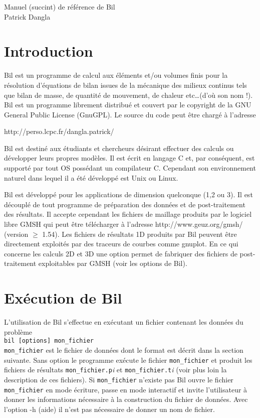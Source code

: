 \documentclass[a4paper,11pt]{article}
\begin{document}
\begin{center}
\LARGE
Manuel (succint) de r\'ef\'erence de Bil\\
\normalsize
Patrick Dangla\\
\end{center}

\section{Introduction}
Bil est un programme de calcul aux \'el\'ements et/ou volumes finis pour la r\'esolution d'\'equations de bilan issues de la m\'ecanique des milieux continus tels que bilan de masse, de quantit\'e de mouvement, de chaleur etc\ldots (d'o\`u son nom !). Bil est un programme librement distribu\'e et couvert par le copyright de la GNU General Public License (GnuGPL). Le source du code peut \^etre charg\'e \`a l'adresse 
\begin{center}
http://perso.lcpc.fr/dangla.patrick/
\end{center}
Bil est destin\'e aux \'etudiants et chercheurs d\'esirant effectuer des calculs ou d\'evelopper leurs propres mod\`eles. Il est \'ecrit en langage C et, par cons\'equent, est support\'e par tout OS poss\'edant un compilateur C. Cependant son environnement naturel dans lequel il a \'et\'e d\'evelopp\'e est Unix ou Linux.

Bil est d\'evelopp\'e pour les applications de dimension quelconque (1,2 ou 3). Il est d\'ecoupl\'e de tout programme de pr\'eparation des donn\'ees et de post-traitement des r\'esultats. Il accepte cependant les fichiers de maillage produits par le logiciel libre GMSH qui peut \^etre t\'el\'echarger \`a l'adresse http://www.geuz.org/gmsh/ (version $\geq$ 1.54). Les fichiers de r\'esultats 1D produits par Bil peuvent \^etre directement exploit\'es par des traceurs de courbes comme gnuplot. En ce qui concerne les calculs 2D et 3D une option permet de fabriquer des fichiers de post-traitement exploitables par GMSH (voir les options de Bil).

\section{Ex\'ecution de Bil}
L'utilisation de Bil s'effectue en ex\'ecutant un fichier contenant les donn\'ees du probl\`eme\\[10pt]
{\tt bil [options] mon\_fichier}\\[10pt]
{\tt mon\_fichier} est le fichier de donn\'ees dont le format est d\'ecrit dans la section suivante. Sans option le programme ex\'ecute le fichier {\tt mon\_fichier} et produit les fichiers de r\'esultats {\tt mon\_fichier.p}\textit{i} et {\tt mon\_fichier.t}\textit{i} (voir plus loin la description de ces fichiers). Si {\tt mon\_fichier} n'existe pas Bil ouvre le fichier {\tt mon\_fichier} en mode \'ecriture, passe en mode interactif et invite l'utilisateur \`a donner les informations n\'ecessaire \`a la construction du fichier de donn\'ees. Avec l'option -h (aide) il n'est pas n\'ecessaire de donner un nom de fichier.
\end{document}
